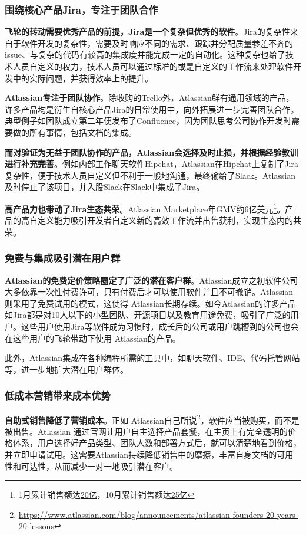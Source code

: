 \subsubsection{围绕核心产品Jira，专注于团队合作}
\textbf{飞轮的转动需要优秀产品的前提，Jira是一个复杂但优秀的软件}。Jira的复杂性来自于软件开发的复杂性，需要及时响应不同的需求、跟踪并分配质量参差不齐的issue、与复杂的代码有较高的集成度并能完成一定的自动化。这种复杂也给了技术人员自定义的权力，技术人员可以通过标准的或是自定义的工作流来处理软件开发中的实际问题，并获得效率上的提升。

\textbf{Atlassian专注于团队协作}。除收购的Trello外，Atlassian鲜有通用领域的产品，许多产品均是衍生自核心产品Jira的日常使用中，向外拓展进一步完善团队合作。典型例子如团队成立第二年便发布了Confluence，因为团队思考公司协作开发时需要做的所有事情，包括文档的集成。

\textbf{而对验证为无益于团队协作的产品，Atlassian会选择及时止损，并根据经验教训进行补充完善}。例如内部工作聊天软件Hipchat，Atlassian在Hipchat上复制了Jira复杂性，便于技术人员自定义但不利于一般地沟通，最终输给了Slack。Atlassian及时停止了该项目，并入股Slack在Slack中集成了Jira。

\textbf{高产品力也带动了Jira生态共荣}。Atlassian Marketplace年GMV约6亿美元\footnote{1月累计销售额达\href{https://www.atlassian.com/blog/announcements/shareholder-letter-q2fy22}{20亿}，10月累计销售额达\href{https://www.linkedin.com/posts/amit-deshpande-785b3449_job-detail-atlassian-activity-6988005559119568896-mPG2?utm_source=share&utm_medium=member_desktop}{25亿}}。产品的高自定义能力吸引开发者自定义新的高效工作流并出售获利，实现生态内的共荣。
\subsubsection{免费与集成吸引潜在用户群}

\textbf{Atlassian的免费定价策略圈定了广泛的潜在客户群}。Atlassian成立之初软件公司大多依靠一次性付费许可，只有付费后才可以使用软件并且不可撤销。Atlassian则采用了免费试用的模式，这使得 Atlassian长期存续。如今Atlassian的许多产品如Jira都是对10人以下的小型团队、开源项目以及教育用途免费，吸引了广泛的用户。这些用户使用Jira等软件成为习惯时，成长后的公司或用户跳槽到的公司也会在这些用户的飞轮带动下使用 Atlassian的产品。

此外，Atlassian集成在各种编程所需的工具中，如聊天软件、IDE、代码托管网站等，进一步地扩大潜在用户群体。

\subsubsection{低成本营销带来成本优势}
\textbf{自助式销售降低了营销成本}。正如 Atlassian自己所说\footnote{\url{https://www.atlassian.com/blog/announcements/atlassian-founders-20-years-20-lessons}}，软件应当被购买，而不是被出售。Atlassian 通过官网让用户自主选择产品套餐，在主页上有完全透明的价格体系，用户选择好产品类型、团队人数和部署方式后，就可以清楚地看到价格，并立即申请试用。这需要Atlassian持续降低销售中的摩擦，丰富自身文档的可用性和可达性，从而减少一对一地吸引潜在客户。

